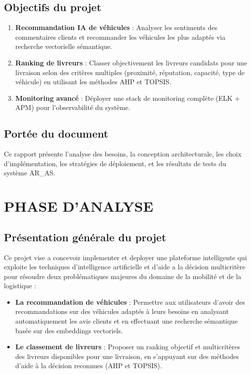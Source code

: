 \documentclass[11pt,a4paper]{report}
\begin{document}
\section*{Objectifs du projet}
\begin{enumerate}
    \item \textbf{Recommandation IA de véhicules} : Analyser les sentiments des commentaires clients et recommander les véhicules les plus adaptés via recherche vectorielle sémantique.
    \item \textbf{Ranking de livreurs} : Classer objectivement les livreurs candidats pour une livraison selon des critères multiples (proximité, réputation, capacité, type de véhicule) en utilisant les méthodes AHP et TOPSIS.
    \item \textbf{Monitoring avancé} : Déployer une stack de monitoring complète (ELK + APM) pour l'observabilité du système.
\end{enumerate}
\section*{Portée du document}
Ce rapport présente l'analyse des besoins, la conception architecturale, les choix d'implémentation, les stratégies de déploiement, et les résultats de tests du système AR\_AS.
\chapter{PHASE D'ANALYSE}

\section{Présentation générale du projet}

Ce projet vise a concevoir implementer et deployer  une plateforme intelligente qui exploite les techniques d'intelligence artificielle et d'aide a la décision multicritère pour résoudre deux problématiques majeures du domaine de la mobilité et de la logistique :

\begin{itemize}
    \item \textbf{La recommandation de véhicules} : Permettre aux utilisateurs d'avoir des recommandations sur des véhicules adaptés à leurs besoins en analysant automatiquement les avis clients et en effectuant une recherche sémantique basée sur des embeddings vectoriels.
    \item \textbf{Le classement de livreurs} : Proposer un ranking objectif et multicritères des livreurs disponibles pour une livraison, en s'appuyant sur des méthodes d'aide à la décision reconnues (AHP et TOPSIS).
\end{itemize}
\end{document}
